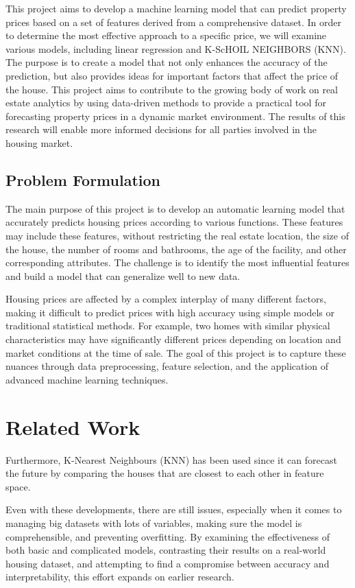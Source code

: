 \documentclass[10pt,conference,compsoc]{IEEEtran}
\begin{document}
{This project aims to develop a machine learning model that can predict property prices based on a set of features derived from a comprehensive dataset. In order to determine the most effective approach to a specific price, we will examine various models, including linear regression and K-ScHOIL NEIGHBORS (KNN). The purpose is to create a model that not only enhances the accuracy of the prediction, but also provides ideas for important factors that affect the price of the house. This project aims to contribute to the growing body of work on real estate analytics by using data-driven methods to provide a practical tool for forecasting property prices in a dynamic market environment. The results of this research will enable more informed decisions for all parties involved in the housing market.

\subsection{Problem Formulation}
The main purpose of this project is to develop an automatic learning model that accurately predicts housing prices according to various functions. These features may include these features, without restricting the real estate location, the size of the house, the number of rooms and bathrooms, the age of the facility, and other corresponding attributes. The challenge is to identify the most influential features and build a model that can generalize well to new data.

Housing prices are affected by a complex interplay of many different factors, making it difficult to predict prices with high accuracy using simple models or traditional statistical methods. For example, two homes with similar physical characteristics may have significantly different prices depending on location and market conditions at the time of sale. The goal of this project is to capture these nuances through data preprocessing, feature selection, and the application of advanced machine learning techniques.

\section{Related Work}
Furthermore, K-Nearest Neighbours (KNN) has been used since it can forecast the future by comparing the houses that are closest to each other in feature space.

Even with these developments, there are still issues, especially when it comes to managing big datasets with lots of variables, making sure the model is comprehensible, and preventing overfitting. By examining the effectiveness of both basic and complicated models, contrasting their results on a real-world housing dataset, and attempting to find a compromise between accuracy and interpretability, this effort expands on earlier research.
}
\end{document}
